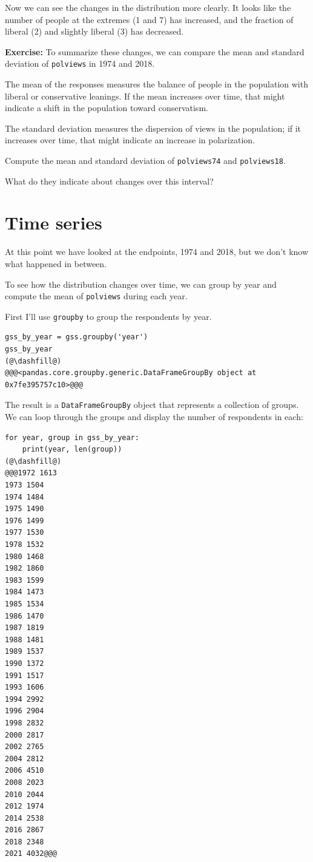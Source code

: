 Now we can see the changes in the distribution more clearly. It looks
like the number of people at the extremes (1 and 7) has increased, and
the fraction of liberal (2) and slightly liberal (3) has decreased.

\textbf{Exercise:} To summarize these changes, we can compare the mean
and standard deviation of \passthrough{\lstinline!polviews!} in 1974 and
2018.

The mean of the responses measures the balance of people in the
population with liberal or conservative leanings. If the mean increases
over time, that might indicate a shift in the population toward
conservatism.

The standard deviation measures the dispersion of views in the
population; if it increases over time, that might indicate an increase
in polarization.

Compute the mean and standard deviation of
\passthrough{\lstinline!polviews74!} and
\passthrough{\lstinline!polviews18!}.

What do they indicate about changes over this interval?

\hypertarget{time-series}{%
\section{Time series}\label{time-series}}

At this point we have looked at the endpoints, 1974 and 2018, but we
don't know what happened in between.

To see how the distribution changes over time, we can group by year and
compute the mean of \passthrough{\lstinline!polviews!} during each year.

First I'll use \passthrough{\lstinline!groupby!} to group the
respondents by year.

\begin{lstlisting}[]
gss_by_year = gss.groupby('year')
gss_by_year
(@\dashfill@)
@@@<pandas.core.groupby.generic.DataFrameGroupBy object at 0x7fe395757c10>@@@
\end{lstlisting}

The result is a \passthrough{\lstinline!DataFrameGroupBy!} object that
represents a collection of groups. We can loop through the groups and
display the number of respondents in each:

\begin{lstlisting}[]
for year, group in gss_by_year:
    print(year, len(group))
(@\dashfill@)
@@@1972 1613
1973 1504
1974 1484
1975 1490
1976 1499
1977 1530
1978 1532
1980 1468
1982 1860
1983 1599
1984 1473
1985 1534
1986 1470
1987 1819
1988 1481
1989 1537
1990 1372
1991 1517
1993 1606
1994 2992
1996 2904
1998 2832
2000 2817
2002 2765
2004 2812
2006 4510
2008 2023
2010 2044
2012 1974
2014 2538
2016 2867
2018 2348
2021 4032@@@
\end{lstlisting}

